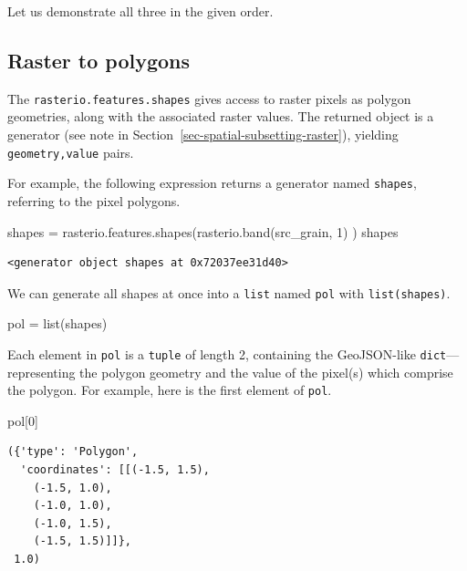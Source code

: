 \documentclass[
  letterpaper,
]{krantz}
\newenvironment{Shaded}{\begin{snugshade}}{\end{snugshade}}
\newcommand{\BuiltInTok}[1]{\textcolor[rgb]{0.00,0.23,0.31}{#1}}
\newcommand{\DecValTok}[1]{\textcolor[rgb]{0.68,0.00,0.00}{#1}}
\newcommand{\NormalTok}[1]{\textcolor[rgb]{0.00,0.23,0.31}{#1}}
\newcommand{\OperatorTok}[1]{\textcolor[rgb]{0.37,0.37,0.37}{#1}}
\begin{document}
Let us demonstrate all three in the given order.

\subsection{Raster to polygons}\label{sec-raster-to-polygons}

The \texttt{rasterio.features.shapes} gives access to raster pixels as
polygon geometries, along with the associated raster values. The
returned object is a generator (see note in
Section~\ref{sec-spatial-subsetting-raster}), yielding
\texttt{geometry,value} pairs.

For example, the following expression returns a generator named
\texttt{shapes}, referring to the pixel polygons.

\begin{Shaded}
\begin{Highlighting}[]
\NormalTok{shapes }\OperatorTok{=}\NormalTok{ rasterio.features.shapes(rasterio.band(src\_grain, }\DecValTok{1}\NormalTok{) )}
\NormalTok{shapes}
\end{Highlighting}
\end{Shaded}

\begin{verbatim}
<generator object shapes at 0x72037ee31d40>
\end{verbatim}

We can generate all shapes at once into a \texttt{list} named
\texttt{pol} with \texttt{list(shapes)}.

\begin{Shaded}
\begin{Highlighting}[]
\NormalTok{pol }\OperatorTok{=} \BuiltInTok{list}\NormalTok{(shapes)}
\end{Highlighting}
\end{Shaded}

Each element in \texttt{pol} is a \texttt{tuple} of length 2, containing
the GeoJSON-like \texttt{dict}---representing the polygon geometry and
the value of the pixel(s) which comprise the polygon. For example, here
is the first element of \texttt{pol}.

\begin{Shaded}
\begin{Highlighting}[]
\NormalTok{pol[}\DecValTok{0}\NormalTok{]}
\end{Highlighting}
\end{Shaded}

\begin{verbatim}
({'type': 'Polygon',
  'coordinates': [[(-1.5, 1.5),
    (-1.5, 1.0),
    (-1.0, 1.0),
    (-1.0, 1.5),
    (-1.5, 1.5)]]},
 1.0)
\end{verbatim}
\end{document}
